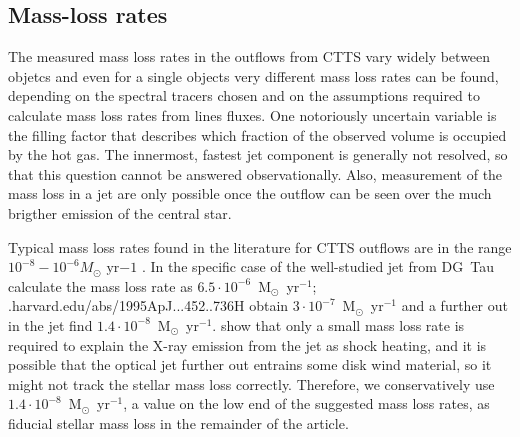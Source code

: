 \subsection{Mass-loss rates}
The measured mass loss rates in the outflows from CTTS vary widely between objetcs and even for a single objects very different mass loss rates can be found, depending on the spectral tracers chosen and on the assumptions required to calculate mass loss rates from lines fluxes. One notoriously uncertain variable is the filling factor that describes which fraction of the observed volume is occupied by the hot gas. The innermost, fastest jet component is generally not resolved, so that this question cannot be answered observationally. Also, measurement of the mass loss in a jet are only possible once the outflow can be seen over the much brigther emission of the central star. 

Typical mass loss rates found in the literature for CTTS outflows are in the range $10^{-8}-10^{-6}M_{\odot}\textrm{ yr}{-1}$ \citep{1999A&A...342..717B,2006A&A...456..189P}. In the specific case of the well-studied jet from DG~Tau \citet{1997A&A...327..671L} calculate the  mass loss rate as $6.5\cdot 10^{-6}$~M$_{\odot}$~yr$^{-1}$; \citetadsabs.harvard.edu/abs/{1995ApJ...452..736H}
obtain $3\cdot 10^{-7}$~M$_{\odot}$~yr$^{-1}$ and a further out in the jet \citet{2000A&A...356L..41L} find $1.4\cdot 10^{-8}$~M$_{\odot}$~yr$^{-1}$. 
\citet{2009A&A...493..579G} show that only a small mass loss rate is required to explain the X-ray emission from the jet as shock heating, and it is possible that the optical jet further out entrains some disk wind material, so it might not track the stellar mass loss correctly.
Therefore, we conservatively use $1.4\cdot 10^{-8}$~M$_{\odot}$~yr$^{-1}$, a value on the low end of the suggested mass loss rates, as fiducial stellar mass loss in the remainder of the article.